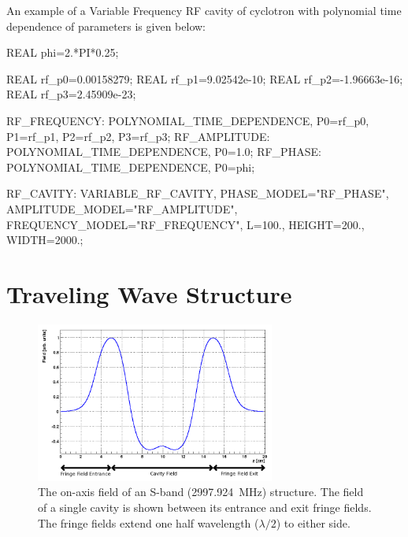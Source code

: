 An example of a Variable Frequency RF cavity of cyclotron with polynomial
time dependence of parameters is given below:
\begin{example}
REAL phi=2.*PI*0.25;

REAL rf_p0=0.00158279;
REAL rf_p1=9.02542e-10;
REAL rf_p2=-1.96663e-16;
REAL rf_p3=2.45909e-23;

RF_FREQUENCY: POLYNOMIAL_TIME_DEPENDENCE, P0=rf_p0, P1=rf_p1, P2=rf_p2, P3=rf_p3;
RF_AMPLITUDE: POLYNOMIAL_TIME_DEPENDENCE, P0=1.0;
RF_PHASE: POLYNOMIAL_TIME_DEPENDENCE, P0=phi;

RF_CAVITY: VARIABLE_RF_CAVITY, PHASE_MODEL="RF_PHASE", AMPLITUDE_MODEL="RF_AMPLITUDE",
           FREQUENCY_MODEL="RF_FREQUENCY", L=100., HEIGHT=200., WIDTH=2000.;
\end{example}

\clearpage
\section{Traveling Wave Structure}
\label{sec:travelingwave}

\begin{figure}[tb]
\centering
\includegraphics[width=0.7\textwidth]{./figures/traveling-wave-structure/FINSB-RAC-field.png}
\caption[The on-axis field of an S-band  structure]{The on-axis field of an S-band (2997.924~MHz)  structure.
    The field of a single cavity is shown between its entrance and exit fringe fields.
    The fringe fields extend one half wavelength ($\lambda/2$) to either side.}
\label{fig:FINSB-RAC-field}
\end{figure}

\begin{figure}[hbt]
  \centering
\end{figure}

